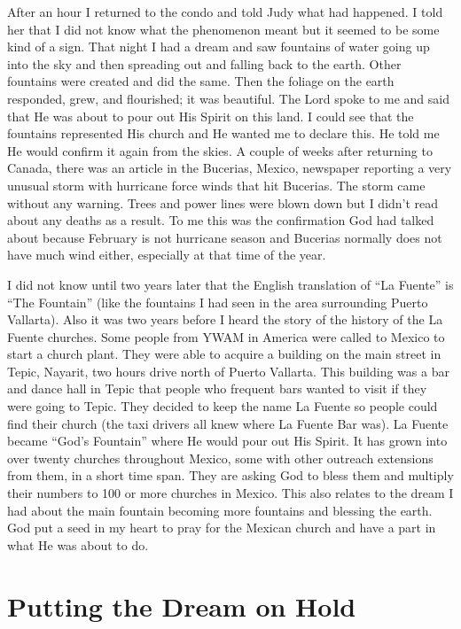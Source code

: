 \documentclass[oneside]{book}
\begin{document}
After an hour I returned to the condo and told Judy what had happened. I told her that I did not know what the phenomenon meant but it seemed to be some kind of a sign. That night I had a dream and saw fountains of water going up into the sky and then spreading out and falling back to the earth. Other fountains were created and did the same. Then the foliage on the earth responded, grew, and flourished; it was beautiful. The Lord spoke to me and said that He was about to pour out His Spirit on this land. I could see that the fountains represented His church and He wanted me to declare this. He told me He would confirm it again from the skies. A couple of weeks after returning to Canada, there was an article in the Bucerias, Mexico, newspaper reporting a very unusual storm with hurricane force winds that hit Bucerias. The storm came without any warning. Trees and power lines were blown down but I didn’t read about any deaths as a result. To me this was the confirmation God had talked about because February is not hurricane season and Bucerias normally does not have much wind either, especially at that time of the year.

I did not know until two years later that the English translation of “La Fuente” is “The Fountain” (like the fountains I had seen in the area surrounding Puerto Vallarta). Also it was two years before I heard the story of the history of the La Fuente churches. Some people from YWAM in America were called to Mexico to start a church plant. They were able to acquire a building on the main street in Tepic, Nayarit, two hours drive north of Puerto Vallarta. This building was a bar and dance hall in Tepic that people who frequent bars wanted to visit if they were going to Tepic. They decided to keep the name La Fuente so people could find their church (the taxi drivers all knew where La Fuente Bar was). La Fuente became “God’s Fountain” where He would pour out His Spirit. It has grown into over twenty churches throughout Mexico, some with other outreach extensions from them, in a short time span. They are asking God to bless them and multiply their numbers to 100 or more churches in Mexico. This also relates to the dream I had about the main fountain becoming more fountains and blessing the earth. God put a seed in my heart to pray for the Mexican church and have a part in what He was about to do.


\section{Putting the Dream on Hold}
\
\end{document}
